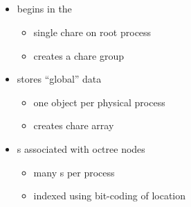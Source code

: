\NEWSEC

\subsection{\ssCharmCello}

\begin{frame}[fragile,label=ss-charm-cello] 
\secframetitle{\ssCharmCello}
\begin{itemize}
\item {} begins in the 
\begin{itemize}
\item single chare on root process
\item creates a  chare group
\end{itemize}
\item {} stores ``global'' data
\begin{itemize}
\item one  object per physical process
\item creates  chare array
\end{itemize}
\item {}s associated with octree nodes
\begin{itemize}
\item many s per process
\item indexed using bit-coding of location
\end{itemize}
\end{itemize}

\end{frame}


